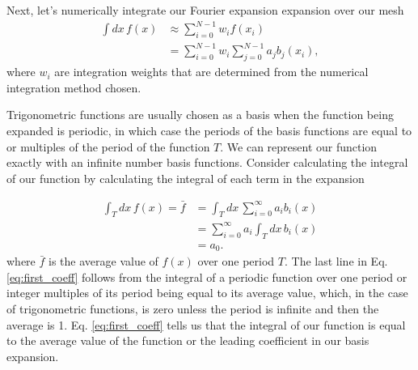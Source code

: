\documentclass[preprint, amsmath, amssymb]{revtex4-1}
\begin{document}
  Next, let's numerically integrate our Fourier expansion expansion over our mesh
  \begin{align} \label{eq:expansion_integral}
    \int dx \, f(x) &\approx \sum_{i = 0}^{N-1} w_i f(x_i) \\ \nonumber
    &= \sum_{i = 0}^{N-1} w_i \sum_{j = 0}^{N-1} a_j b_j(x_i),
  \end{align}
  where $w_i$ are integration weights that are determined from the numerical integration method chosen.
  
  Trigonometric functions are usually chosen as a basis when the function being expanded is periodic, in which case the periods of the basis functions are equal to or multiples of the period of the function $T$. We can represent our function exactly with an infinite number basis functions. Consider calculating the integral of our function by calculating the integral of each term in the expansion

  \begin{align}
    \int_T dx \, f(x) = \bar{f} &= \int_T dx \, \sum_{i = 0}^{\infty} a_i b_i(x) \nonumber \\
    &= \sum_{i = 0}^{\infty} a_i \int_T dx \, b_i(x) \nonumber \\
    &= a_0. \label{eq:first_coeff}
  \end{align}
  where $\bar{f}$ is the average value of $f(x)$ over one period $T$. The last line in Eq. \ref{eq:first_coeff} follows from the integral of a periodic function over one period or integer multiples of its period being equal to its average value, which, in the case of trigonometric functions, is zero unless the period is infinite and then the average is 1. Eq. \ref{eq:first_coeff} tells us that the integral of our function is equal to the average value of the function or the leading coefficient in our basis expansion.
\end{document}
